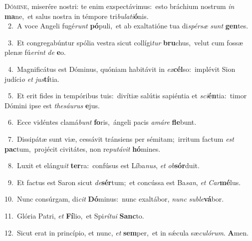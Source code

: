\lettrine{\initial\textcolor{\initialcolor}{D}}{ómine,} miserére nostri: te enim exspectávimus:~\dagger esto bráchium nostrum \textit{in} \textbf{ma}\-ne,~\star et salus nostra in témpore tri\-\textit{bu}\-\textit{la}\textit{ti}\textbf{ó}nis.\\
{\numbfont\textcolor{\numbcolor}{~2.}}~A voce Angeli fugé\textit{runt} \textbf{pó}\-puli,~\star et ab exaltatióne tua di\-\textit{spér}\-\textit{sæ} \textit{sunt} \textbf{gen}\-tes.\par
{\numbfont\textcolor{\numbcolor}{~3.}}~Et congregabúntur spólia vestra sicut collígi\textit{tur} \textbf{bru}\-chus,~\star velut cum fossæ plenæ fú\-\textit{e}\-\textit{rint} \textit{de} \textbf{e}\-o.\par
{\numbfont\textcolor{\numbcolor}{~4.}}~Magnificátus est Dóminus, quóniam habitávit in \textit{ex}\-\textbf{cél}so:~\star implévit Sion judíci\textit{o} \textit{et} \textit{jus}\-\textbf{tí}tia.\par
{\numbfont\textcolor{\numbcolor}{~5.}}~Et erit fides in tempóribus tuis:~\dagger divítiæ salútis sapiéntia et \textit{sci}\-\textbf{én}tia:~\star timor Dómini ipse est \textit{the}\-\textit{sáu}\textit{rus} \textbf{e}\-jus.\par
{\numbfont\textcolor{\numbcolor}{~6.}}~Ecce vidéntes clamá\textit{bunt} \textbf{fo}\-ris,~\star ángeli pacis \textit{a}\-\textit{má}\textit{re} \textbf{fle}\-bunt.\par
{\numbfont\textcolor{\numbcolor}{~7.}}~Dissipátæ sunt viæ, cessávit tránsiens per sémitam;~\dagger irritum factum \textit{est} \textbf{pac}\-tum,~\star projécit civitátes, non re\-\textit{pu}\-\textit{tá}\textit{vit} \textbf{hó}\-mines.\par
{\numbfont\textcolor{\numbcolor}{~8.}}~Luxit et elángu\textit{it} \textbf{ter}\-ra:~\star confúsus est Líba\-\textit{nus}\-, \textit{et} \textit{ob}\-\textbf{sór}duit.\par
{\numbfont\textcolor{\numbcolor}{~9.}}~Et factus est Saron sicut \textit{de}\-\textbf{sér}tum;~\star et concússa est Ba\-\textit{san}\-, \textit{et} \textit{Car}\-\textbf{mé}lus.\par
{\numbfont\textcolor{\numbcolor}{10.}}~Nunc consúrgam, di\textit{cit} \textbf{Dó}\-minus:~\star nunc exaltábor, \textit{nunc} \textit{sub}\-\textit{le}\textbf{vá}bor.\par
{\numbfont\textcolor{\numbcolor}{11.}}~Glória Patri, \textit{et} \textbf{Fí}\-lio,~\star et Spi\-\textit{rí}\-\textit{tu}\textit{i} \textbf{Sanc}\-to.\par
{\numbfont\textcolor{\numbcolor}{12.}}~Sicut erat in princípio, et nunc, \textit{et} \textbf{sem}\-per,~\star et in sǽcula sæ\-\textit{cu}\-\textit{ló}\textit{rum}. \textbf{A}\-men.\par
